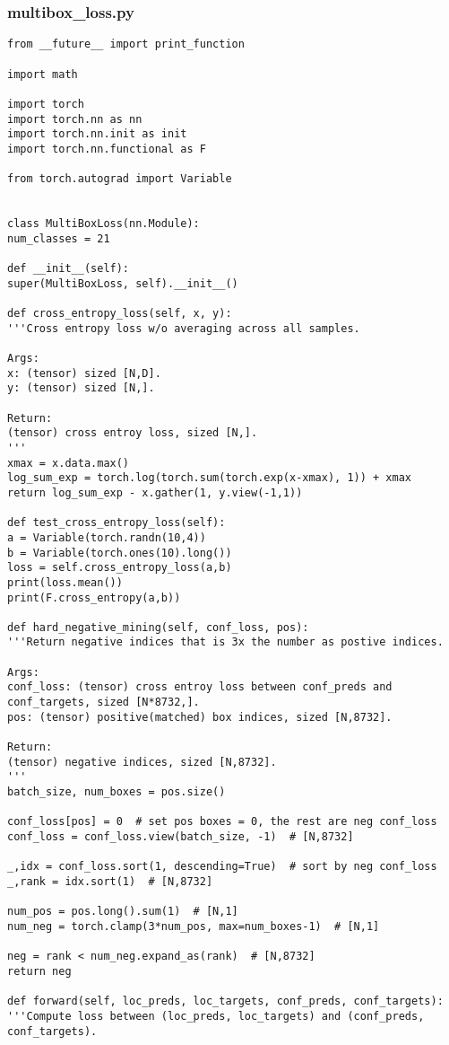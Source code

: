 \subsubsection*{multibox\_loss.py}
\begin{lstlisting}
from __future__ import print_function

import math

import torch
import torch.nn as nn
import torch.nn.init as init
import torch.nn.functional as F

from torch.autograd import Variable


class MultiBoxLoss(nn.Module):
num_classes = 21

def __init__(self):
super(MultiBoxLoss, self).__init__()

def cross_entropy_loss(self, x, y):
'''Cross entropy loss w/o averaging across all samples.

Args:
x: (tensor) sized [N,D].
y: (tensor) sized [N,].

Return:
(tensor) cross entroy loss, sized [N,].
'''
xmax = x.data.max()
log_sum_exp = torch.log(torch.sum(torch.exp(x-xmax), 1)) + xmax
return log_sum_exp - x.gather(1, y.view(-1,1))

def test_cross_entropy_loss(self):
a = Variable(torch.randn(10,4))
b = Variable(torch.ones(10).long())
loss = self.cross_entropy_loss(a,b)
print(loss.mean())
print(F.cross_entropy(a,b))

def hard_negative_mining(self, conf_loss, pos):
'''Return negative indices that is 3x the number as postive indices.

Args:
conf_loss: (tensor) cross entroy loss between conf_preds and conf_targets, sized [N*8732,].
pos: (tensor) positive(matched) box indices, sized [N,8732].

Return:
(tensor) negative indices, sized [N,8732].
'''
batch_size, num_boxes = pos.size()

conf_loss[pos] = 0  # set pos boxes = 0, the rest are neg conf_loss
conf_loss = conf_loss.view(batch_size, -1)  # [N,8732]

_,idx = conf_loss.sort(1, descending=True)  # sort by neg conf_loss
_,rank = idx.sort(1)  # [N,8732]

num_pos = pos.long().sum(1)  # [N,1]
num_neg = torch.clamp(3*num_pos, max=num_boxes-1)  # [N,1]

neg = rank < num_neg.expand_as(rank)  # [N,8732]
return neg

def forward(self, loc_preds, loc_targets, conf_preds, conf_targets):
'''Compute loss between (loc_preds, loc_targets) and (conf_preds, conf_targets).


\end{lstlisting}
